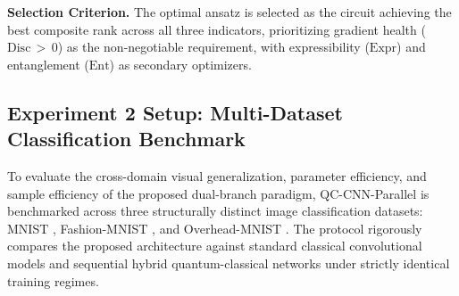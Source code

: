 \documentclass[pdflatex,sn-mathphys-num]{sn-jnl}%
\theoremstyle{thmstyleone}%
\theoremstyle{thmstyletwo}%
\theoremstyle{thmstylethree}%
\begin{document}
\textbf{Selection Criterion.} The optimal ansatz is selected as the circuit achieving the best composite rank across all three indicators, prioritizing gradient health ($\mathrm{Disc} \,{>}\, 0$) as the non-negotiable requirement, with expressibility ($\mathrm{Expr}$) and entanglement ($\mathrm{Ent}$) as secondary optimizers.

\subsection{Experiment 2 Setup: Multi-Dataset Classification Benchmark}
\label{subsec:exp2_setup}
To evaluate the cross-domain visual generalization, parameter efficiency, and sample efficiency of the proposed dual-branch paradigm, QC-CNN-Parallel is benchmarked across three structurally distinct image classification datasets: MNIST \cite{lecun1998gradient}, Fashion-MNIST \cite{xiao2017fashion}, and Overhead-MNIST \cite{liu2026parallel}. The protocol rigorously compares the proposed architecture against standard classical convolutional models and sequential hybrid quantum-classical networks under strictly identical training regimes.
\end{document}
